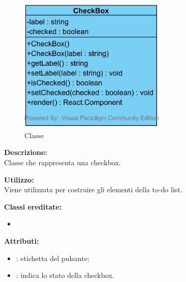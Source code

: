 \paragraph[::CheckBox]{\class}\mbox{}\\ \label{\class}
\begin{figure}[H]
	\centering
	\includegraphics[width=7cm]{./diagrammi/framework/view/gui/checkbox.png}
	\caption{Classe \class}
\end{figure}
\textbf{Descrizione:}\\
Classe che rappresenta una checkbox.

\textbf{Utilizzo:}\\
Viene utilizzata per costruire gli elementi della to-do list.

\textbf{Classi ereditate:}
\begin{itemize}
	\item {}
\end{itemize}


\textbf{Attributi:}
\begin{itemize}
	\item {}: etichetta del pulsante;
	\item {}: indica lo stato della checkbox.
\end{itemize}

